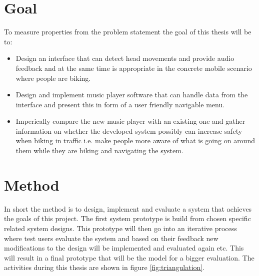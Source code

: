 \section{Goal}
To measure properties from the problem statement the goal of this thesis will be to:
\begin{itemize}
\item Design an interface that can detect head movements and provide audio feedback and at the same time is appropriate in the concrete mobile scenario where people are biking.
\item Design and implement music player software that can handle data from the interface and present this in form of a user friendly navigable menu.
\item Imperically compare the new music player with an existing one and gather information on whether the developed system possibly can increase safety when biking in traffic i.e. make people more aware of what is going on around them while they are biking and navigating the system.
\end{itemize}



\section{Method}
In short the method is to design, implement and evaluate a system that achieves the goals of this project. The first system prototype is build from chosen specific related system designs. This prototype will then go into an iterative process where test users evaluate the system and based on their feedback new modifications to the design will be implemented and evaluated again etc. This will result in a final prototype that will be the model for a bigger evaluation. The activities during this thesis are shown in figure \ref{fig:triangulation}.

